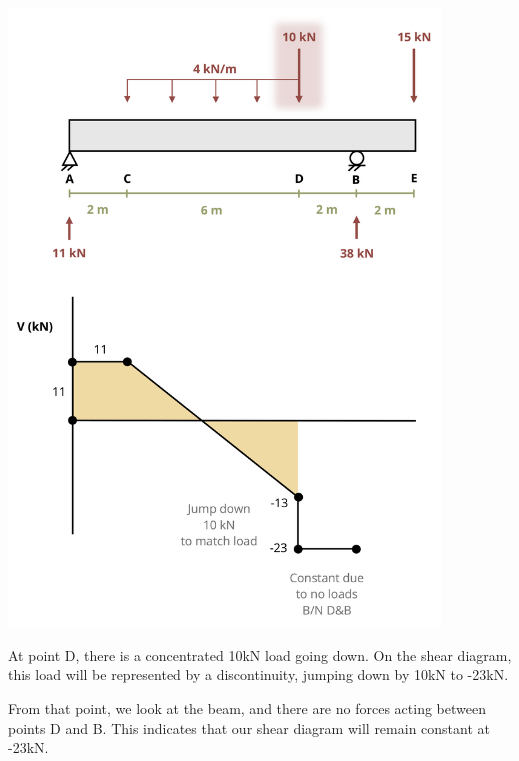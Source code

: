 \documentclass[
  letterpaper,
  DIV=11,
  numbers=noendperiod]{scrreprt}
\begin{document}
\begin{tcolorbox}
\begin{tcolorbox}
\begin{center}
\includegraphics[width=4.52083in,height=\textheight]{images/CH7 PNGs/example 7.3 part 5.png}
\end{center}

At point D, there is a concentrated 10kN load going down. On the shear
diagram, this load will be represented by a discontinuity, jumping down
by 10kN to -23kN.

From that point, we look at the beam, and there are no forces acting
between points D and B. This indicates that our shear diagram will
remain constant at -23kN.


\end{tcolorbox}
\end{tcolorbox}
\end{document}
